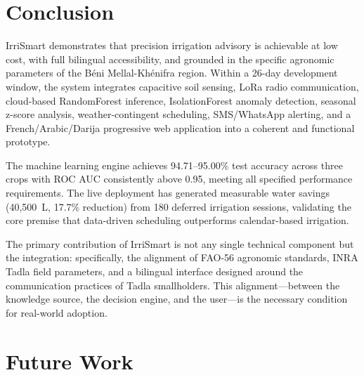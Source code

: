 \documentclass[12pt,a4paper]{report}
\begin{document}
\chapter{Conclusion}

IrriSmart demonstrates that precision irrigation advisory is achievable at low cost, with full bilingual accessibility, and grounded in the specific agronomic parameters of the Béni Mellal-Khénifra region. Within a 26-day development window, the system integrates capacitive soil sensing, LoRa radio communication, cloud-based RandomForest inference, IsolationForest anomaly detection, seasonal z-score analysis, weather-contingent scheduling, SMS/WhatsApp alerting, and a French/Arabic/Darija progressive web application into a coherent and functional prototype.

The machine learning engine achieves 94.71--95.00\% test accuracy across three crops with ROC AUC consistently above 0.95, meeting all specified performance requirements. The live deployment has generated measurable water savings (40,500~L, 17.7\% reduction) from 180 deferred irrigation sessions, validating the core premise that data-driven scheduling outperforms calendar-based irrigation.

The primary contribution of IrriSmart is not any single technical component but the integration: specifically, the alignment of FAO-56 agronomic standards, INRA Tadla field parameters, and a bilingual interface designed around the communication practices of Tadla smallholders. This alignment---between the knowledge source, the decision engine, and the user---is the necessary condition for real-world adoption.

\chapter{Future Work}
\end{document}
